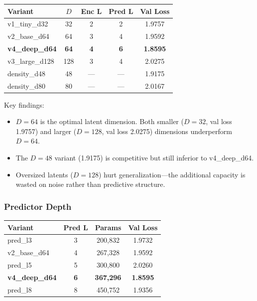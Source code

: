 \documentclass[11pt]{article}
\begin{document}
\begin{center}
\begin{tabular}{lcccc}
\toprule
Variant & $D$ & Enc L & Pred L & Val Loss \\
\midrule
v1\_tiny\_d32  & 32  & 2 & 2 & 1.9757 \\
v2\_base\_d64  & 64  & 3 & 4 & 1.9592 \\
\textbf{v4\_deep\_d64} & \textbf{64} & \textbf{4} & \textbf{6} & \textbf{1.8595} \\
v3\_large\_d128 & 128 & 3 & 4 & 2.0275 \\
density\_d48   & 48  & --- & --- & 1.9175 \\
density\_d80   & 80  & --- & --- & 2.0167 \\
\bottomrule
\end{tabular}
\end{center}

\noindent Key findings:
\begin{itemize}[nosep]
  \item $D=64$ is the optimal latent dimension. Both smaller ($D=32$, val loss 1.9757) and larger ($D=128$, val loss 2.0275) dimensions underperform $D=64$.
  \item The $D=48$ variant (1.9175) is competitive but still inferior to v4\_deep\_d64.
  \item Oversized latents ($D=128$) hurt generalization---the additional capacity is wasted on noise rather than predictive structure.
\end{itemize}

\subsubsection{Predictor Depth}

\begin{center}
\begin{tabular}{lccc}
\toprule
Variant  & Pred L & Params   & Val Loss \\
\midrule
pred\_l3     & 3 & 200,832  & 1.9732 \\
v2\_base\_d64 & 4 & 267,328  & 1.9592 \\
pred\_l5     & 5 & 300,800  & 2.0260 \\
\textbf{v4\_deep\_d64} & \textbf{6} & \textbf{367,296} & \textbf{1.8595} \\
pred\_l8     & 8 & 450,752  & 1.9356 \\
\bottomrule
\end{tabular}
\end{center}
\end{document}
